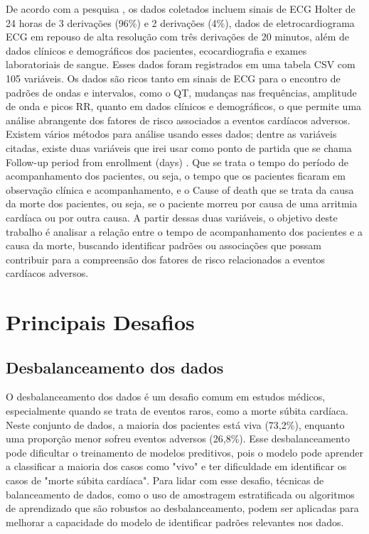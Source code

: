De acordo com a pesquisa \cite{physionet2020music}, os dados coletados incluem sinais de ECG Holter de 24 horas de 3 derivações (96\%) e 2 derivações (4\%), dados de eletrocardiograma \gls{ECG} em repouso de alta resolução com três derivações de 20 minutos, além de dados clínicos e demográficos dos pacientes, ecocardiografia e exames laboratoriais de sangue. Esses dados foram registrados em uma tabela CSV com 105 variáveis. Os dados são ricos tanto em sinais de ECG para o encontro de padrões de ondas e intervalos, como o QT, mudanças nas frequências, amplitude de onda e picos RR, quanto em dados clínicos e demográficos, o que permite uma análise abrangente dos fatores de risco associados a eventos cardíacos adversos. Existem vários métodos para análise usando esses dados; dentre as variáveis citadas, existe duas variáveis que irei usar como ponto de partida que se chama Follow-up period from enrollment (days)  \cite{physionet2020music_dataset}. Que se trata o tempo do período de acompanhamento dos pacientes, ou seja, o tempo que os pacientes ficaram em observação clínica e acompanhamento, e o Cause of death \cite{physionet2020music_dataset} que se trata da causa da morte dos pacientes, ou seja, se o paciente morreu por causa de uma arritmia cardíaca ou por outra causa. A partir dessas duas variáveis, o objetivo deste trabalho é analisar a relação entre o tempo de acompanhamento dos pacientes e a causa da morte, buscando identificar padrões ou associações que possam contribuir para a compreensão dos fatores de risco relacionados a eventos cardíacos adversos.

\section{Principais Desafios}\label{sec:PrincipaisDesafios}

\subsection{Desbalanceamento dos dados} \label{sec:DesbalanceamentoDosDados}
O desbalanceamento dos dados é um desafio comum em estudos médicos, especialmente quando se trata de eventos raros, como a morte súbita cardíaca. Neste conjunto de dados, a maioria dos pacientes está viva (73,2\%), enquanto uma proporção menor sofreu eventos adversos (26,8\%). Esse desbalanceamento pode dificultar o treinamento de modelos preditivos, pois o modelo pode aprender a classificar a maioria dos casos como "vivo" e ter dificuldade em identificar os casos de "morte súbita cardíaca". Para lidar com esse desafio, técnicas de balanceamento de dados, como o uso de amostragem estratificada ou algoritmos de aprendizado que são robustos ao desbalanceamento, podem ser aplicadas para melhorar a capacidade do modelo de identificar padrões relevantes nos dados.


